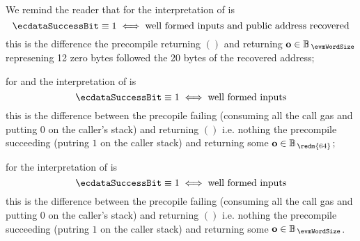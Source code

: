 We remind the reader that
for 
the interpretation of \ecdataSuccessBit{} is
\[
	\ecdataSuccessBit \equiv 1 \iff \text{well formed inputs and public address recovered}
\]
this is the difference the precompile returning $()$ and returning $\textbf{o} \in \mathbb{B}_{\,\evmWordSize}$ represening 12 zero bytes followed the 20 bytes of the recovered address;

\par
for  and 
the interpretation of \ecdataSuccessBit{} is
\[
	\ecdataSuccessBit \equiv 1 \iff \text{well formed inputs}
\]
this is the difference between
the precopile failing (consuming all the call gas and putting $0$ on the caller's stack) and returning $()$ i.e. nothing
the precompile succeeding (putring $1$ on the caller stack) and returning some $\textbf{o} \in \mathbb{B}_{\,\redm{64}}$;

\par
for 
the interpretation of \ecdataSuccessBit{} is
\[
	\ecdataSuccessBit \equiv 1 \iff \text{well formed inputs}
\]
this is the difference between
the precopile failing (consuming all the call gas and putting $0$ on the caller's stack) and returning $()$ i.e. nothing
the precompile succeeding (putring $1$ on the caller stack) and returning some $\textbf{o} \in \mathbb{B}_{\,\evmWordSize}$.
